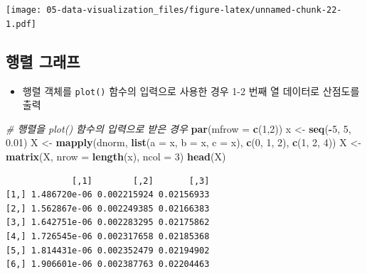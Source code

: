\documentclass[
  11pt,
]{krantz}
\newenvironment{Shaded}{\begin{snugshade}}{\end{snugshade}}
\newcommand{\CommentTok}[1]{\textcolor[rgb]{0.37,0.37,0.37}{\textit{#1}}}
\newcommand{\DataTypeTok}[1]{\textcolor[rgb]{0.27,0.27,0.27}{#1}}
\newcommand{\DecValTok}[1]{\textcolor[rgb]{0.06,0.06,0.06}{#1}}
\newcommand{\FloatTok}[1]{\textcolor[rgb]{0.06,0.06,0.06}{#1}}
\newcommand{\KeywordTok}[1]{\textcolor[rgb]{0.27,0.27,0.27}{\textbf{#1}}}
\newcommand{\NormalTok}[1]{#1}
\newcommand{\OperatorTok}[1]{\textcolor[rgb]{0.43,0.43,0.43}{\textbf{#1}}}
\newcommand{\StringTok}[1]{\textcolor[rgb]{0.5,0.5,0.5}{#1}}
\providecommand{\tightlist}{%
  \setlength{\itemsep}{0pt}\setlength{\parskip}{0pt}}
\begin{document}
\texttt{[image: 05-data-visualization\_files/figure-latex/unnamed-chunk-22-1.pdf]}

\normalsize

\hypertarget{mat-plot}{%
\subsection{행렬 그래프}\label{mat-plot}}

\begin{itemize}
\tightlist
\item
  행렬 객체를 \texttt{plot()} 함수의 입력으로 사용한 경우 1-2 번째 열 데이터로 산점도를 출력
\end{itemize}

\footnotesize

\begin{Shaded}
\begin{Highlighting}[]
\CommentTok{# 행렬을 plot() 함수의 입력으로 받은 경우}
\KeywordTok{par}\NormalTok{(}\DataTypeTok{mfrow =} \KeywordTok{c}\NormalTok{(}\DecValTok{1}\NormalTok{,}\DecValTok{2}\NormalTok{))}
\NormalTok{x <-}\StringTok{ }\KeywordTok{seq}\NormalTok{(}\OperatorTok{-}\DecValTok{5}\NormalTok{, }\DecValTok{5}\NormalTok{, }\FloatTok{0.01}\NormalTok{)}
\NormalTok{X <-}\StringTok{ }\KeywordTok{mapply}\NormalTok{(dnorm, }
            \KeywordTok{list}\NormalTok{(}\DataTypeTok{a =}\NormalTok{ x, }\DataTypeTok{b =}\NormalTok{ x, }\DataTypeTok{c =}\NormalTok{ x), }
            \KeywordTok{c}\NormalTok{(}\DecValTok{0}\NormalTok{, }\DecValTok{1}\NormalTok{, }\DecValTok{2}\NormalTok{), }
            \KeywordTok{c}\NormalTok{(}\DecValTok{1}\NormalTok{, }\DecValTok{2}\NormalTok{, }\DecValTok{4}\NormalTok{))}
\NormalTok{X <-}\StringTok{ }\KeywordTok{matrix}\NormalTok{(X, }\DataTypeTok{nrow =} \KeywordTok{length}\NormalTok{(x), }\DataTypeTok{ncol =} \DecValTok{3}\NormalTok{)}
\KeywordTok{head}\NormalTok{(X)}
\end{Highlighting}
\end{Shaded}

\begin{verbatim}
             [,1]        [,2]       [,3]
[1,] 1.486720e-06 0.002215924 0.02156933
[2,] 1.562867e-06 0.002249385 0.02166383
[3,] 1.642751e-06 0.002283295 0.02175862
[4,] 1.726545e-06 0.002317658 0.02185368
[5,] 1.814431e-06 0.002352479 0.02194902
[6,] 1.906601e-06 0.002387763 0.02204463
\end{verbatim}
\end{document}
